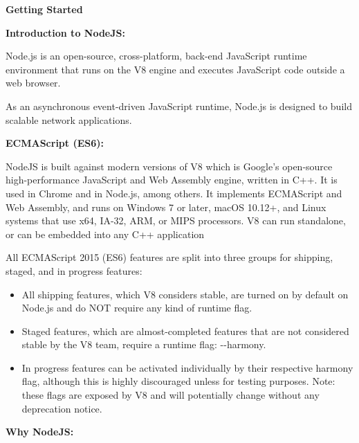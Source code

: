 \documentclass[
]{article}
\author{}
\date{}
\providecommand{\tightlist}{%
  \setlength{\itemsep}{0pt}\setlength{\parskip}{0pt}}
\begin{document}
{\textbf{Getting Started}}

{\textbf{Introduction to NodeJS:}}

Node.js is an open-source, cross-platform, back-end JavaScript runtime
environment that runs on the V8 engine and executes JavaScript code
outside a web browser.

As an asynchronous event-driven JavaScript runtime, Node.js is designed
to build scalable network applications.

\hfill 

{\textbf{ECMAScript (ES6):}}

NodeJS is built against modern versions of V8 which is Google's
open-source high-performance JavaScript and Web Assembly engine, written
in C++. It is used in Chrome and in Node.js, among others. It implements
ECMAScript and Web Assembly, and runs on Windows 7 or later, macOS
10.12+, and Linux systems that use x64, IA-32, ARM, or MIPS processors.
V8 can run standalone, or can be embedded into any C++ application

\hfill

All ECMAScript 2015 (ES6) features are split into three groups for
shipping, staged, and in progress features:

\begin{itemize}
\tightlist
\item
  All shipping features, which V8 considers stable, are turned on by
  default on Node.js and do NOT require any kind of runtime flag.
\end{itemize}

\hfill

\begin{itemize}
\tightlist
\item
  Staged features, which are almost-completed features that are not
  considered stable by the V8 team, require a runtime flag: -\/-harmony.
\end{itemize}

\hfill

\begin{itemize}
\tightlist
\item
  In progress features can be activated individually by their respective
  harmony flag, although this is highly discouraged unless for testing
  purposes. Note: these flags are exposed by V8 and will potentially
  change without any deprecation notice.
\end{itemize}

\hfill    

{\textbf{Why NodeJS:}}
\end{document}
